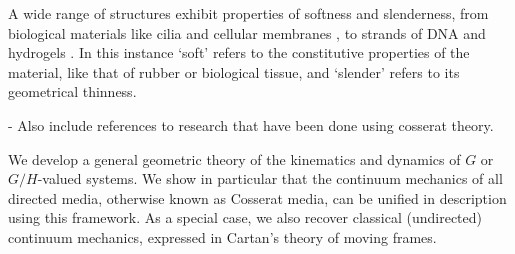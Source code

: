 \documentclass[withindex,glossary,techreport]{cam-thesis}
\begin{document}

A wide range of structures exhibit properties of softness and slenderness, from biological materials like cilia \citep{guMagneticCiliaCarpets2020} and cellular membranes \citep{krishnaswamyCosserattypeModelRed1996}, to strands of DNA \citep{corazzaUnravelingLoopingEfficiency2022a} and hydrogels \citep{rajanMechanicsViscoelasticBuckling2019}. In this instance `soft' refers to the constitutive properties of the material, like that of rubber or biological tissue, and `slender' refers to its geometrical thinness.

- Also include references to research that have been done using cosserat theory.


We develop a general geometric theory of the kinematics and dynamics of $G$ or $G/H$-valued systems. We show in particular that the continuum mechanics of all directed media, otherwise known as Cosserat media, can be unified in description using this framework. As a special case, we also recover classical (undirected) continuum mechanics, expressed in Cartan's theory of moving frames.
\end{document}
